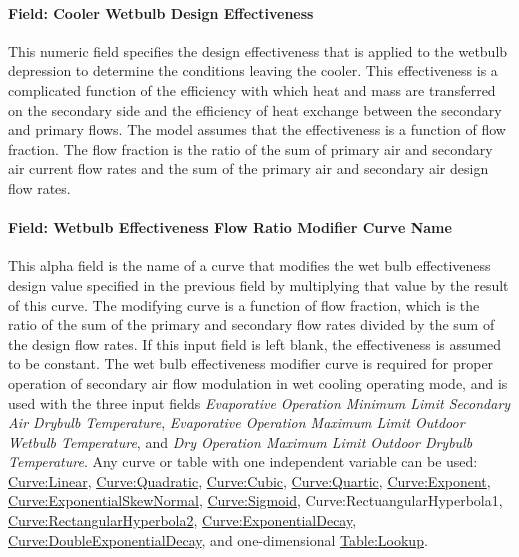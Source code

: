 \paragraph{Field: Cooler Wetbulb Design Effectiveness}\label{field-cooler-wetbulb-design-effectiveness}

This numeric field specifies the design effectiveness that is applied to the wetbulb depression to determine the conditions leaving the cooler. This effectiveness is a complicated function of the efficiency with which heat and mass are transferred on the secondary side and the efficiency of heat exchange between the secondary and primary flows. The model assumes that the effectiveness is a function of flow fraction. The flow fraction is the ratio of the sum of primary air and secondary air current flow rates and the sum of the primary air and secondary air design flow rates.

\paragraph{Field: Wetbulb Effectiveness Flow Ratio Modifier Curve Name}\label{field-wet-bulb-effectiveness-flow-ratio-modifier-curve-name}

This alpha field is the name of a curve that modifies the wet bulb effectiveness design value specified in the previous field by multiplying that value by the result of this curve. The modifying curve is a function of flow fraction, which is the ratio of the sum of the primary and secondary flow rates divided by the sum of the design flow rates. If this input field is left blank, the effectiveness is assumed to be constant. The wet bulb effectiveness modifier curve is required for proper operation of secondary air flow modulation in wet cooling operating mode, and is used with the three input fields \textit{Evaporative Operation Minimum Limit Secondary Air Drybulb Temperature}, \textit{Evaporative Operation Maximum Limit Outdoor Wetbulb Temperature}, and \textit{Dry Operation Maximum Limit Outdoor Drybulb Temperature}. Any curve or table with one independent variable can be used: \hyperref[curvelinear]{Curve:Linear}, \hyperref[curvequadratic]{Curve:Quadratic}, \hyperref[curvecubic]{Curve:Cubic}, \hyperref[curvequartic]{Curve:Quartic}, \hyperref[curveexponent]{Curve:Exponent}, \hyperref[curveexponentialskewnormal]{Curve:ExponentialSkewNormal}, \hyperref[curvesigmoid]{Curve:Sigmoid}, Curve:RectuangularHyperbola1, \hyperref[curverectangularhyperbola2]{Curve:RectangularHyperbola2}, \hyperref[curveexponentialdecay]{Curve:ExponentialDecay}, \hyperref[curvedoubleexponentialdecay]{Curve:DoubleExponentialDecay}, and one-dimensional \hyperref[tablelookup]{Table:Lookup}.

